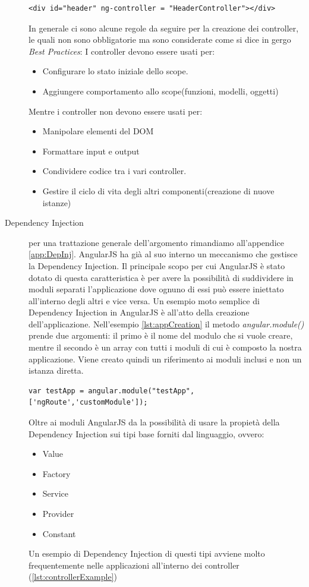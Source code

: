 \begin{description}
\begin{lstlisting}[caption={Associazione tra un elemento del DOM e un controller}, label={lst:newController}]
	<div id="header" ng-controller = "HeaderController"></div>
\end{lstlisting}
In generale ci sono alcune regole da seguire per la creazione dei controller, le quali non sono obbligatorie ma sono considerate come si dice in gergo \emph{Best Practices}:
I controller devono essere usati per:
\begin{itemize}
\item Configurare lo stato iniziale dello scope.
\item Aggiungere comportamento allo scope(funzioni, modelli, oggetti)
\end{itemize}
Mentre i controller non devono essere usati per:
\begin{itemize}
\item Manipolare elementi del DOM
\item Formattare input e output
\item Condividere codice tra i vari controller.
\item Gestire il ciclo di vita degli altri componenti(creazione di nuove istanze)
\end{itemize}

\item[Dependency Injection] per una trattazione generale dell'argomento rimandiamo all'appendice \ref{app:DepInj}. AngularJS ha già al suo interno un meccanismo che gestisce la Dependency Injection. Il principale scopo per cui AngularJS è stato dotato di questa caratteristica è per avere la possibilità di suddividere in moduli separati l'applicazione dove ognuno di essi può essere iniettato all'interno degli altri e vice versa. Un esempio moto semplice di Dependency Injection in AngularJS è all'atto della creazione dell'applicazione. Nell'esempio \ref{lst:appCreation} il metodo \textit{angular.module()} prende due argomenti: il primo è il nome del modulo che si vuole creare, mentre il secondo è un array con tutti i moduli di cui è composto la nostra applicazione. Viene creato quindi un riferimento ai moduli inclusi e non un istanza diretta.  
\begin{lstlisting}[caption = {Creazione di una applicazione in AngularJS con le relative dipendenze}, 
				   label = {lst:appCreation}]
	var testApp = angular.module("testApp",['ngRoute','customModule']);
\end{lstlisting}

Oltre ai moduli AngularJS da la possibilità di usare la propietà della Dependency Injection sui tipi base forniti dal linguaggio, ovvero:
\begin{itemize}
\item Value
\item Factory
\item Service
\item Provider
\item Constant
\end{itemize}
Un esempio di Dependency Injection di questi tipi avviene molto frequentemente nelle applicazioni all'interno dei controller (\ref{lst:controllerExample})


\end{description}
